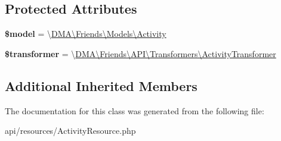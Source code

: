 \subsection*{Protected Attributes}
\begin{DoxyCompactItemize}
\item 
\hypertarget{classDMA_1_1Friends_1_1API_1_1Resources_1_1ActivityResource_a976c47842f6a25c165f60892c6bd0476}{}{\bfseries \$model} = \textquotesingle{}\textbackslash{}\hyperlink{classDMA_1_1Friends_1_1Models_1_1Activity}{D\+M\+A\textbackslash{}\+Friends\textbackslash{}\+Models\textbackslash{}\+Activity}\textquotesingle{}\label{classDMA_1_1Friends_1_1API_1_1Resources_1_1ActivityResource_a976c47842f6a25c165f60892c6bd0476}

\item 
\hypertarget{classDMA_1_1Friends_1_1API_1_1Resources_1_1ActivityResource_a896cc90a8f4e586e2cf26b73252b6f7f}{}{\bfseries \$transformer} = \textquotesingle{}\textbackslash{}\hyperlink{classDMA_1_1Friends_1_1API_1_1Transformers_1_1ActivityTransformer}{D\+M\+A\textbackslash{}\+Friends\textbackslash{}\+A\+P\+I\textbackslash{}\+Transformers\textbackslash{}\+Activity\+Transformer}\textquotesingle{}\label{classDMA_1_1Friends_1_1API_1_1Resources_1_1ActivityResource_a896cc90a8f4e586e2cf26b73252b6f7f}

\end{DoxyCompactItemize}
\subsection*{Additional Inherited Members}


The documentation for this class was generated from the following file\+:\begin{DoxyCompactItemize}
\item 
api/resources/Activity\+Resource.\+php\end{DoxyCompactItemize}
